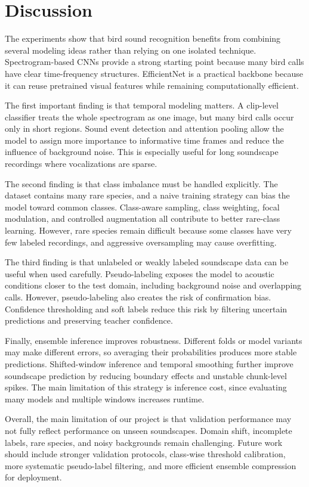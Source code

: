 \documentclass[a4paper,12pt]{article}
\begin{document}
\section{Discussion}
The experiments show that bird sound recognition benefits from combining several modeling ideas rather than relying on one isolated technique. Spectrogram-based CNNs provide a strong starting point because many bird calls have clear time-frequency structures. EfficientNet is a practical backbone because it can reuse pretrained visual features while remaining computationally efficient.

The first important finding is that temporal modeling matters. A clip-level classifier treats the whole spectrogram as one image, but many bird calls occur only in short regions. Sound event detection and attention pooling allow the model to assign more importance to informative time frames and reduce the influence of background noise. This is especially useful for long soundscape recordings where vocalizations are sparse.

The second finding is that class imbalance must be handled explicitly. The dataset contains many rare species, and a naive training strategy can bias the model toward common classes. Class-aware sampling, class weighting, focal modulation, and controlled augmentation all contribute to better rare-class learning. However, rare species remain difficult because some classes have very few labeled recordings, and aggressive oversampling may cause overfitting.

The third finding is that unlabeled or weakly labeled soundscape data can be useful when used carefully. Pseudo-labeling exposes the model to acoustic conditions closer to the test domain, including background noise and overlapping calls. However, pseudo-labeling also creates the risk of confirmation bias. Confidence thresholding and soft labels reduce this risk by filtering uncertain predictions and preserving teacher confidence.

Finally, ensemble inference improves robustness. Different folds or model variants may make different errors, so averaging their probabilities produces more stable predictions. Shifted-window inference and temporal smoothing further improve soundscape prediction by reducing boundary effects and unstable chunk-level spikes. The main limitation of this strategy is inference cost, since evaluating many models and multiple windows increases runtime.

Overall, the main limitation of our project is that validation performance may not fully reflect performance on unseen soundscapes. Domain shift, incomplete labels, rare species, and noisy backgrounds remain challenging. Future work should include stronger validation protocols, class-wise threshold calibration, more systematic pseudo-label filtering, and more efficient ensemble compression for deployment.
\end{document}
